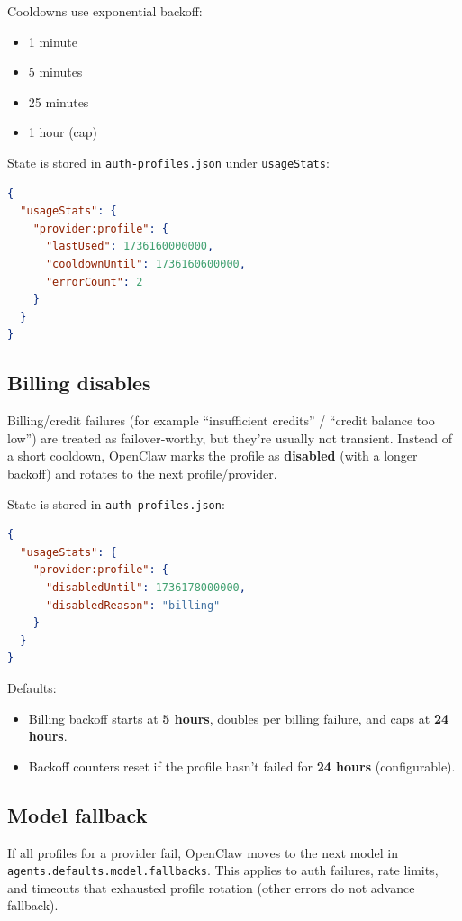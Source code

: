 Cooldowns use exponential backoff:

\begin{itemize}
  \item 1 minute
  \item 5 minutes
  \item 25 minutes
  \item 1 hour (cap)
\end{itemize}


State is stored in \texttt{auth-profiles.json} under \texttt{usageStats}:

\begin{lstlisting}[language=json]
{
  "usageStats": {
    "provider:profile": {
      "lastUsed": 1736160000000,
      "cooldownUntil": 1736160600000,
      "errorCount": 2
    }
  }
}
\end{lstlisting}


\subsection{Billing disables}


Billing/credit failures (for example “insufficient credits” / “credit balance too low”) are treated as failover‑worthy, but they’re usually not transient. Instead of a short cooldown, OpenClaw marks the profile as \textbf{disabled} (with a longer backoff) and rotates to the next profile/provider.

State is stored in \texttt{auth-profiles.json}:

\begin{lstlisting}[language=json]
{
  "usageStats": {
    "provider:profile": {
      "disabledUntil": 1736178000000,
      "disabledReason": "billing"
    }
  }
}
\end{lstlisting}


Defaults:

\begin{itemize}
  \item Billing backoff starts at \textbf{5 hours}, doubles per billing failure, and caps at \textbf{24 hours}.
  \item Backoff counters reset if the profile hasn’t failed for \textbf{24 hours} (configurable).
\end{itemize}


\subsection{Model fallback}


If all profiles for a provider fail, OpenClaw moves to the next model in
\texttt{agents.defaults.model.fallbacks}. This applies to auth failures, rate limits, and
timeouts that exhausted profile rotation (other errors do not advance fallback).


